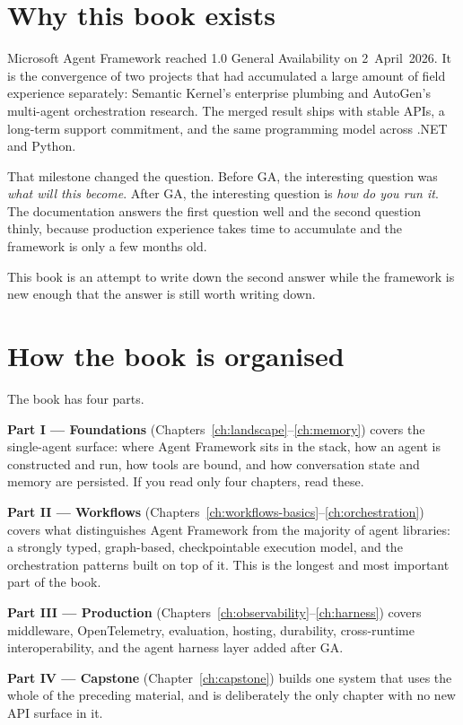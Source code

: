 \section*{Why this book exists}

Microsoft Agent Framework reached 1.0 General Availability on 2~April~2026. It is
the convergence of two projects that had accumulated a large amount of field
experience separately: Semantic Kernel's enterprise plumbing and AutoGen's
multi-agent orchestration research. The merged result ships with stable APIs, a
long-term support commitment, and the same programming model across .NET and Python.

That milestone changed the question. Before GA, the interesting question was
\emph{what will this become}. After GA, the interesting question is \emph{how do
you run it}. The documentation answers the first question well and the second
question thinly, because production experience takes time to accumulate and the
framework is only a few months old.

This book is an attempt to write down the second answer while the framework is
new enough that the answer is still worth writing down.

\section*{How the book is organised}

The book has four parts.

\textbf{Part I --- Foundations} (Chapters~\ref{ch:landscape}--\ref{ch:memory})
covers the single-agent surface: where Agent Framework sits in the stack, how an
agent is constructed and run, how tools are bound, and how conversation state and
memory are persisted. If you read only four chapters, read these.

\textbf{Part II --- Workflows} (Chapters~\ref{ch:workflows-basics}--\ref{ch:orchestration})
covers what distinguishes Agent Framework from the majority of agent libraries:
a strongly typed, graph-based, checkpointable execution model, and the
orchestration patterns built on top of it. This is the longest and most
important part of the book.

\textbf{Part III --- Production} (Chapters~\ref{ch:observability}--\ref{ch:harness})
covers middleware, OpenTelemetry, evaluation, hosting, durability, cross-runtime
interoperability, and the agent harness layer added after GA.

\textbf{Part IV --- Capstone} (Chapter~\ref{ch:capstone}) builds one system that
uses the whole of the preceding material, and is deliberately the only chapter
with no new API surface in it.


